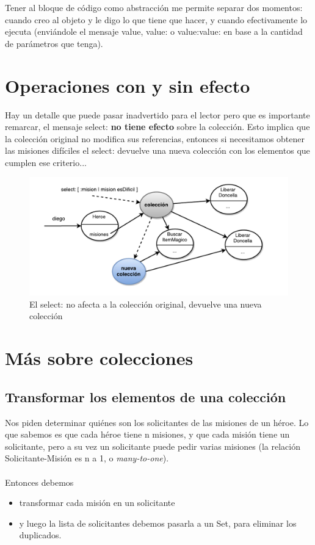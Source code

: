 \documentclass[a4paper,12pt]{book}
\begin{document}
Tener al bloque de código como abstracción me permite separar dos momentos: cuando creo al objeto y le digo lo
que tiene que hacer, y cuando efectivamente lo ejecuta (enviándole el mensaje value, value: o value:value: en
base a la cantidad de parámetros que tenga).

\section{Operaciones con y sin efecto}

Hay un detalle que puede pasar inadvertido para el lector pero que es importante remarcar, el mensaje select:
\textbf{no tiene efecto} sobre la colección. Esto implica que la colección original no modifica sus referencias,
entonces si necesitamos obtener las misiones difíciles el select: devuelve una nueva colección con los elementos
que cumplen ese criterio...

\begin{figure}[h!]
    \centering
    \includegraphics[width=1.1\textwidth]{images/20_select_sin_efecto.pdf}
    \caption{El select: no afecta a la colección original, devuelve una nueva colección}
\end{figure}


\section{Más sobre colecciones}

\subsection{Transformar los elementos de una colección}
Nos piden determinar quiénes son los solicitantes de las misiones de un héroe. Lo que sabemos es que cada
héroe tiene n misiones, y que cada misión tiene un solicitante, pero a su vez un solicitante puede pedir
varias misiones (la relación Solicitante-Misión es n a 1, o \textit{many-to-one}).
\\
\\
Entonces debemos
\begin{itemize}
 \item transformar cada misión en un solicitante
 \item y luego la lista de solicitantes debemos pasarla a un Set, para eliminar los duplicados.
\end{itemize}
\end{document}
